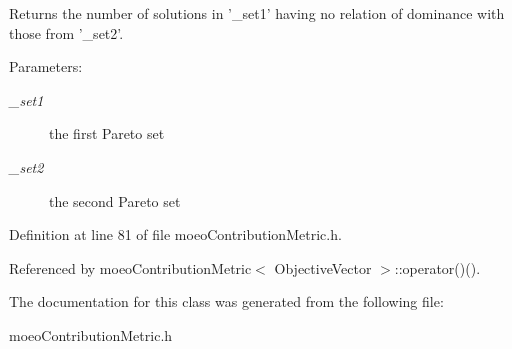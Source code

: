 Returns the number of solutions in '\_\-set1' having no relation of dominance with those from '\_\-set2'. 

\begin{Desc}
\item[Parameters:]
\begin{description}
\item[{\em \_\-set1}]the first Pareto set \item[{\em \_\-set2}]the second Pareto set \end{description}
\end{Desc}


Definition at line 81 of file moeo\-Contribution\-Metric.h.

Referenced by moeo\-Contribution\-Metric$<$ Objective\-Vector $>$::operator()().

The documentation for this class was generated from the following file:\begin{CompactItemize}
\item 
moeo\-Contribution\-Metric.h\end{CompactItemize}
